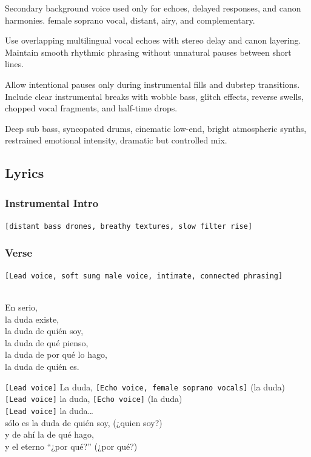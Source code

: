 Secondary background voice used only for echoes, delayed responses, and
canon harmonies. female soprano vocal, distant, airy, and complementary.

Use overlapping multilingual vocal echoes with stereo delay and canon
layering. Maintain smooth rhythmic phrasing without unnatural pauses
between short lines.

Allow intentional pauses only during instrumental fills and dubstep
transitions. Include clear instrumental breaks with wobble bass, glitch
effects, reverse swells, chopped vocal fragments, and half-time drops.

Deep sub bass, syncopated drums, cinematic low-end, bright atmospheric
synths, restrained emotional intensity, dramatic but controlled mix.

\subsection{Lyrics}\label{lyrics-28}

\subsubsection{Instrumental Intro}\label{instrumental-intro}

\texttt{{[}distant\ bass\ drones,\ breathy\ textures,\ slow\ filter\ rise{]}}

\subsubsection{Verse}\label{verse}

\texttt{{[}Lead\ voice,\ soft\ sung\ male\ voice,\ intimate,\ connected\ phrasing{]}}\strut \\
En serio,\\
la duda existe,\\
la duda de quién soy,\\
la duda de qué pienso,\\
la duda de por qué lo hago,\\
la duda de quién es.

\texttt{{[}Lead\ voice{]}} La duda,
\texttt{{[}Echo\ voice,\ female\ soprano\ vocals{]}} (la duda)\\
\texttt{{[}Lead\ voice{]}} la duda, \texttt{{[}Echo\ voice{]}} (la
duda)\\
\texttt{{[}Lead\ voice{]}} la duda\ldots{}\\
sólo es la duda de quién soy, (¿quien soy?)\\
y de ahí la de qué hago,\\
y el eterno ``¿por qué?'' (¿por qué?)

